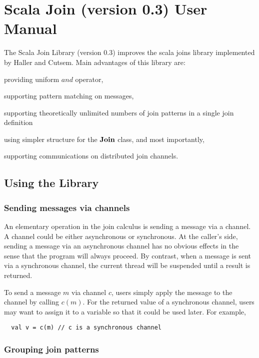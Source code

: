 \section{Scala Join (version 0.3) User Manual}
\label{app_lib}

The Scala Join Library (version 0.3) improves the scala joins library \cite{scala_joins} implemented by Haller and Cutsem.  Main advantages of this library are: 
\begin{inparaenum}[(i)]
  \item providing uniform $and$ operator,
  \item supporting pattern matching on messages,
  \item supporting theoretically unlimited numbers of join patterns in a single join definition
  \item using simpler structure for the $\bf{Join}$ class, and most importantly,
  \item supporting communications on distributed join channels.
\end{inparaenum}  

\subsection{Using the Library}
\subsubsection{Sending messages via channels}
An elementary operation in the join calculus is sending a message via a channel.  A channel could be either asynchronous or synchronous.  At the caller's side, sending a message via an asynchronous channel has no obvious effects in the sense that the program will always proceed.  By contrast, when a message is sent via a synchronous channel, the current thread will be suspended until a result is returned.  

To send a message $m$ via channel $c$, users simply apply the message to the channel by calling $c(m)$.  For the returned value of a synchronous channel, users may want to assign it to a variable so that it could be used later.  For example,
\begin{lstlisting}
  val v = c(m) // c is a synchronous channel
\end{lstlisting}

\subsubsection{Grouping join patterns}

